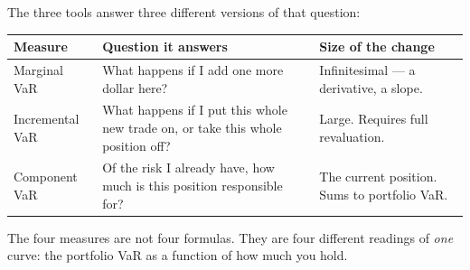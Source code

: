 The three tools answer three different versions of that question:

\renewcommand{\arraystretch}{1.25}
\noindent\begin{tabularx}{\textwidth}{@{}>{\raggedright\arraybackslash}p{2.7cm}XX@{}}
\toprule
\textbf{\sffamily\small Measure} & \textbf{\sffamily\small Question it answers} & \textbf{\sffamily\small Size of the change} \\
\midrule
Marginal VaR & What happens if I add one more dollar here? & Infinitesimal --- a derivative, a slope. \\
Incremental VaR & What happens if I put this whole new trade on, or take this whole position off? & Large. Requires full revaluation. \\
Component VaR & Of the risk I already have, how much is this position responsible for? & The current position. Sums to portfolio VaR. \\
\bottomrule
\end{tabularx}
\renewcommand{\arraystretch}{1}

\gapbadge
{}

\begin{imgapbox}[title={What the objective asks for}]
The four measures are not four formulas. They are four different readings of
\emph{one} curve: the portfolio VaR as a function of how much you hold.
\end{imgapbox}

